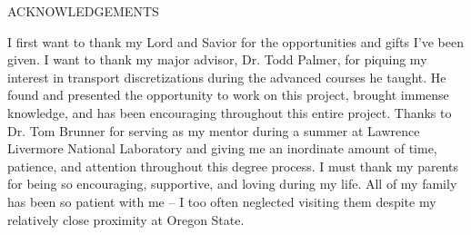 \documentclass[12pt]{article}
\begin{document}
\begin{center}
ACKNOWLEDGEMENTS
\end{center}

I first want to thank my Lord and Savior for the opportunities and gifts I've been given. I want to thank my major advisor, Dr. Todd Palmer, for piquing my interest in transport discretizations during the advanced courses he taught. He found and presented the opportunity to work on this project, brought immense knowledge, and has been encouraging throughout this entire project. Thanks to Dr. Tom Brunner for serving as my mentor during a summer at Lawrence Livermore National Laboratory and giving me an inordinate amount of time, patience, and attention throughout this degree process. I must thank my parents for being so encouraging, supportive, and loving during my life. All of my family has been so patient with me -- I too often neglected visiting them despite my relatively close proximity at Oregon State.
\end{document}
